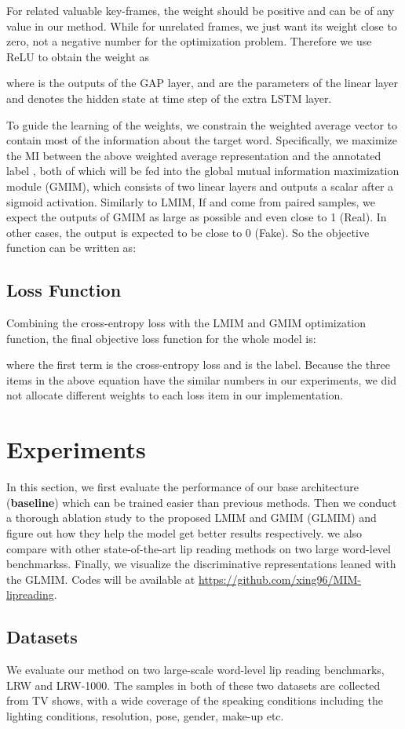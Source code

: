 \documentclass[a4paper, 10pt, conference]{ieeeconf}      \usepackage{FG2020}
\begin{document}
\noindent For related valuable key-frames, the weight  should be positive and can be of any value in our method. While for unrelated frames, we just want its weight close to zero, not a negative number for the optimization problem. Therefore we use ReLU to obtain the weight  as

\noindent where  is the outputs of the GAP layer,  and  are the parameters of the linear layer and   denotes the hidden state at time step  of the extra LSTM layer.

To guide the learning of the weights, we constrain the weighted average vector to contain most of the information about the target word. Specifically, we maximize the MI between the above weighted average representation  and the annotated label , both of which will be fed into the global mutual information maximization module (GMIM), which consists of two linear layers and outputs a scalar after a sigmoid activation. Similarly to LMIM, If   and  come from paired samples, we expect the outputs of GMIM as large as possible and even close to 1 (Real). In other cases, the output is expected to be close to 0 (Fake). So the objective function can be written as:

\subsection{Loss Function}
Combining the cross-entropy loss with the LMIM and GMIM optimization function, the final objective loss function for the whole model is:

\noindent where the first term is the cross-entropy loss and  is the label. Because the three items in the above equation have the similar numbers in our experiments, we did not allocate different weights to each loss item in our implementation. \section{Experiments}
In this section, we first evaluate the performance of our base architecture (\textbf{baseline}) which can be trained easier than previous methods. Then we conduct a thorough ablation study to the proposed LMIM and GMIM (GLMIM) and figure out how they help the model get better results respectively. we also compare with other state-of-the-art lip reading methods on two large word-level benchmarkss. Finally, we visualize the discriminative representations leaned with the GLMIM. Codes will be available at {\url{https://github.com/xing96/MIM-lipreading}}.
\subsection{Datasets}\label{4.1}
We evaluate our method on two large-scale word-level lip reading benchmarks, LRW and LRW-1000. The samples in both of these two datasets are collected from TV shows, with a wide coverage of the speaking conditions including the lighting conditions, resolution, pose, gender, make-up etc.
\end{document}
